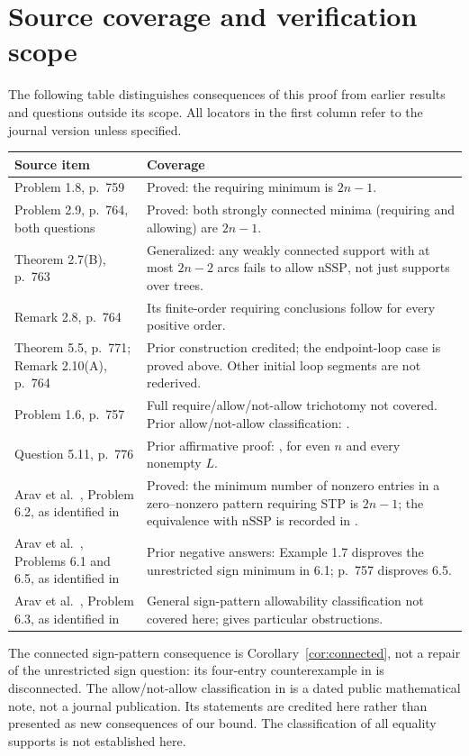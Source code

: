 \documentclass[11pt]{article}
\newcommand{\nssp}{\mathrm{nSSP}}
\begin{document}
\section{Source coverage and verification scope}
The following table distinguishes consequences of this proof from
earlier results and questions outside its scope. All locators in the
first column refer to the journal version \cite{KO} unless specified.
\begin{center}\small
\begin{tabularx}{\textwidth}{@{}p{}X@{}}
\toprule
Source item & Coverage\\
\midrule
Problem 1.8, p.~759 & Proved: the requiring minimum is $2n-1$.\\
Problem 2.9, p.~764, both questions & Proved: both strongly connected minima
(requiring and allowing) are $2n-1$.\\
Theorem 2.7(B), p.~763 & Generalized: any weakly connected support with at
most $2n-2$ arcs fails to allow $\nssp$, not just supports over trees.\\
Remark 2.8, p.~764 & Its finite-order requiring conclusions follow for every
positive order.\\
Theorem 5.5, p.~771; Remark 2.10(A), p.~764 & Prior construction credited;
the endpoint-loop case is proved above. Other initial loop segments are
not rederived.\\
Problem 1.6, p.~757 & Full require/allow/not-allow trichotomy not covered.
Prior allow/not-allow classification: \cite[Theorem 6.1]{Paths}.\\
Question 5.11, p.~776 & Prior affirmative proof:
\cite[Corollary 6.2]{Paths}, for even $n$ and every nonempty $L$.\\
Arav et al.\ \cite{Arav}, Problem 6.2, as identified in
\cite[p.~759]{KO} & Proved: the minimum number of nonzero entries in a
zero--nonzero pattern requiring STP is $2n-1$; the equivalence with $\nssp$
is recorded in \cite[p.~756]{KO}.\\
Arav et al.\ \cite{Arav}, Problems 6.1 and 6.5, as identified in
\cite[pp.~757--759]{KO} & Prior negative answers: Example 1.7 disproves the
unrestricted sign minimum in 6.1; p.~757 disproves 6.5.\\
Arav et al.\ \cite{Arav}, Problem 6.3, as identified in
\cite[p.~763]{KO} & General sign-pattern allowability classification
not covered here; \cite[Theorem 2.7]{KO} gives particular obstructions.\\
\bottomrule
\end{tabularx}
\end{center}
The connected sign-pattern consequence is Corollary~\ref{cor:connected},
not a repair of the unrestricted sign question: its four-entry
counterexample in \cite[Example 1.7]{KO} is disconnected.
The allow/not-allow classification in \cite{Paths} is a dated public
mathematical note, not a journal publication. Its statements are
credited here rather than presented as new consequences of our bound.
The classification of all equality supports is not established here.
\end{document}
